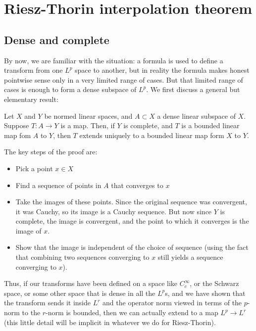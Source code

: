\documentclass[a4paper]{amsart}
\begin{document}

\section{Riesz-Thorin interpolation theorem}

\subsection{Dense and complete}

By now, we are familiar with the situation: a formula is used to
define a transform from one $L^p$ space to another, but in reality the
formula makes honest pointwise sense only in a very limited range of
cases. But that limited range of cases is enough to form a dense
subspace of $L^p$. We first discuss a general but elementary result:

\begin{claimer}
  Let $X$ and $Y$ be normed linear spaces, and $A \subset X$ a dense
  linear subspace of $X$. Suppose $T: A \to Y$ is a map. Then, if $Y$
  is complete, and $T$ is a bounded linear map fom $A$ to $Y$, then
  $T$ extends uniquely to a bounded linear map form $X$ to $Y$.
\end{claimer}

The key steps of the proof are:

\begin{itemize}

\item Pick a point $x \in X$

\item Find a sequence of points in $A$ that converges to $x$

\item Take the images of these points. Since the original sequence was
  convergent, it was Cauchy, so its image is a Cauchy sequence. But
  now since $Y$ is complete, the image is convergent, and the point to
  which it converges is the image of $x$.

\item Show that the image is independent of the choice of sequence
  (using the fact that combining two sequences converging to $x$ still
  yields a sequence converging to $x$).

\end{itemize}

Thus, if our transforms have been defined on a space like
$C_c^\infty$, or the Schwarz space, or some other space that is dense
in all the $L^p$s, and we have shown that the transform sends it
inside $L^r$ and the operator norm viewed in terms of the $p$-norm to
the $r$-norm is bounded, then we can actually extend to a map $L^p \to
L^r$ (this little detail will be implicit in whatever we do for
Riesz-Thorin).
\end{document}
